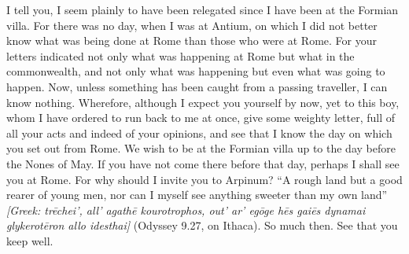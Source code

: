 

 I tell you, I seem plainly to have been relegated since I have been at the Formian villa. For there was no day, when I was at Antium, on which I did not better know what was being done at Rome than those who were at Rome. For your letters indicated not only what was happening at Rome but what in the commonwealth, and not only what was happening but even what was going to happen. Now, unless something has been caught from a passing traveller, I can know nothing. Wherefore, although I expect you yourself by now, yet to this boy, whom I have ordered to run back to me at once, give some weighty letter, full of all your acts and indeed of your opinions, and see that I know the day on which you set out from Rome. We wish to be at the Formian villa up to the day before the Nones of May. If you have not come there before that day, perhaps I shall see you at Rome. For why should I invite you to Arpinum? ``A rough land but a good rearer of young men, nor can I myself see anything sweeter than my own land'' \textit{[Greek: tr\=echei', all' agath\=e kourotrophos, out' ar' eg\=oge h\=es gai\=es dynamai glykerot\=eron allo idesthai]} (Odyssey 9.27, on Ithaca). So much then. See that you keep well.
